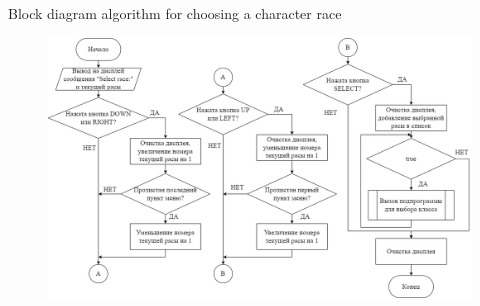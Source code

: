 \documentclass[12pt,a4paper,mathserif]{beamer}
\begin{document}
\begin{frame}[fragile]{{\small Block diagram algorithm for choosing a character race}}
\begin{figure}
        \centering
        \includegraphics[width=\textwidth]{racePers.png}
        \label{fig:racePers}
    \end{figure}
\end{frame}

\newlength\someheight
\setlength{}
\end{document}
